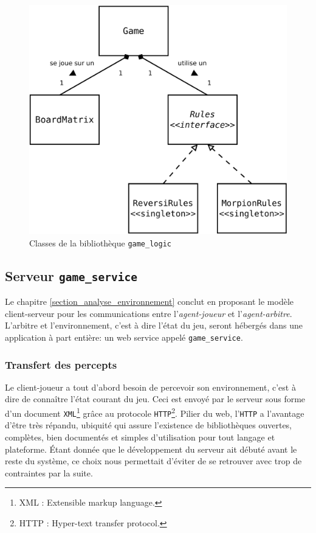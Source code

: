 \begin{figure}[H] 
\centering
\includegraphics[width=\textwidth]{files/env/game_logic} 
\caption{Classes de la bibliothèque \texttt{game\_logic}} 
\label{game_logic}
\end{figure}

\subsection{Serveur \texttt{game\_service}}
Le chapitre \ref{section_analyse_environnement} conclut en proposant le modèle client-serveur pour les communications entre l'\emph{agent-joueur} et l'\emph{agent-arbitre}. L'arbitre et l'environnement, c'est à dire l'état du jeu, seront hébergés dans une application à part entière: un \og web service \fg{} appelé \texttt{game\_service}.
\subsubsection{Transfert des percepts}
Le client-joueur a tout d'abord besoin de percevoir son environnement, c'est à dire de connaître l'état courant du jeu. Ceci est envoyé par le serveur sous forme d'un  document \texttt{XML}\footnote{ XML : Extensible markup language. } grâce au protocole \texttt{HTTP}\footnote{ HTTP : Hyper-text transfer  protocol. }. Pilier du web, l'\texttt{HTTP} a l'avantage d'être très  répandu, ubiquité qui assure l'existence de bibliothèques ouvertes,  complètes, bien documentés et simples d'utilisation pour tout langage et  plateforme. Étant donnée que le développement du serveur ait débuté avant le reste du système, ce choix nous permettait d'éviter de se retrouver avec trop  de contraintes par la suite.
